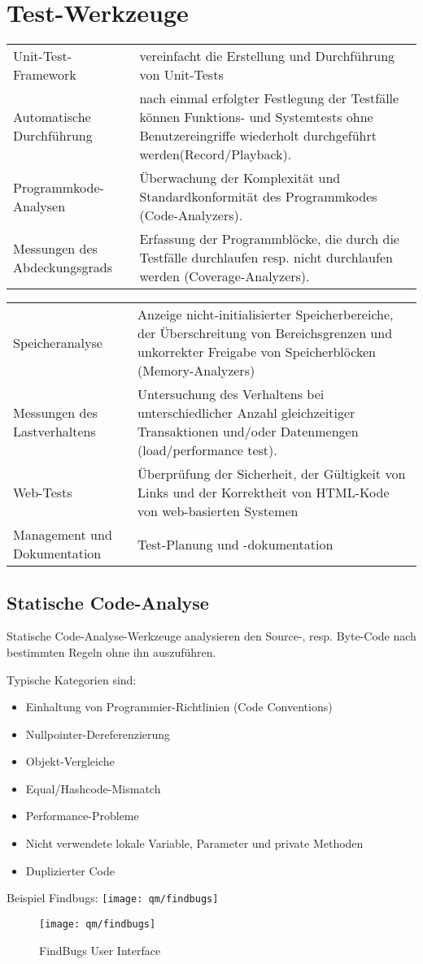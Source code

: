 %
%
\section{Test-Werkzeuge}
\begin{tabularx}{\linewidth}{l|X}
 Unit-Test-Framework & vereinfacht die Erstellung und Durchführung von
 Unit-Tests\\
 Automatische Durchführung  & nach einmal erfolgter Festlegung der Testfälle
   können Funktions- und Systemtests ohne Benutzereingriffe wiederholt
  durchgeführt werden(Record/Playback).\\
Programmkode-Analysen & \"Uberwachung der Komplexität
  und Standardkonformität des Programmkodes (Code-Analyzers).\\
 Messungen des Abdeckungsgrads & Erfassung der Programmblöcke, die durch
  die Testfälle durchlaufen resp. nicht durchlaufen werden
 (Coverage-Analyzers).\\
\end{tabularx}
\newslide
\begin{tabularx}{\linewidth}{l|X}
 Speicheranalyse & Anzeige nicht-initialisierter
   Speicherbereiche, der \"Uberschreitung von Bereichsgrenzen und unkorrekter
   Freigabe von Speicherblöcken (Memory-Analyzers)\\
 Messungen des Lastverhaltens & Untersuchung des
  Verhaltens bei unterschiedlicher Anzahl gleichzeitiger Transaktionen
  und/oder Datenmengen (load/performance test).\\
 Web-Tests& \"Uberprüfung der Sicherheit, der Gültigkeit von Links und
  der Korrektheit von HTML-Kode von web-basierten Systemen\\
 Management und Dokumentation & Test-Planung und -dokumentation \\
\end{tabularx}
\newpage
\subsection{Statische Code-Analyse}
Statische Code-Analyse-Werkzeuge analysieren den
 Source-, resp. Byte-Code nach bestimmten Regeln
ohne ihn auszuführen.

Typische Kategorien sind:
\begin{itemize}
\item Einhaltung von Programmier-Richtlinien (Code Conventions)
\item Nullpointer-Dereferenzierung
\item Objekt-Vergleiche
\item Equal/Hashcode-Mismatch
\item Performance-Probleme
\item Nicht verwendete lokale Variable, Parameter und private Methoden
\item Duplizierter Code
\end{itemize}
%
Beispiel Findbugs:
\ifslides
\texttt{[image: qm/findbugs]}
\else
\begin{figure}[H]
\centering
\texttt{[image: qm/findbugs]}
\caption{FindBugs User Interface}
\end{figure}
\fi
%
\newslide
